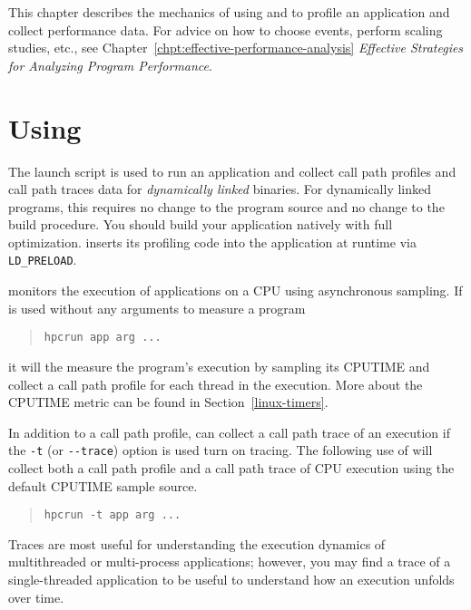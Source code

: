 
This chapter describes the mechanics of using \hpcrun{} and \hpclink{}
to profile an application and collect performance data.  For advice on
how to choose events, perform scaling studies, etc., see
Chapter~\ref{chpt:effective-performance-analysis} {\it Effective
Strategies for Analyzing Program Performance}.

\section{Using \hpcrun{}}

The \hpcrun{} launch script is used to run an application and collect
call path profiles and call path traces  data for {\it dynamically linked\/} binaries. For
dynamically linked programs, this requires no change to the program
source and no change to the build procedure.  You should build your
application natively with full optimization.  \hpcrun{} inserts its
profiling code into the application at runtime via \verb|LD_PRELOAD|.

\hpcrun{} monitors the execution of applications on a CPU using asynchronous sampling.  If \hpcrun{} is used without any arguments to measure a program  
 
 \begin{quote}
\begin{verbatim}
hpcrun app arg ...
\end{verbatim}
\end{quote}

\noindent
it will the measure the program's execution by sampling its CPUTIME and collect a call path profile for each thread in the execution. More about the CPUTIME metric can be found in Section~\ref{linux-timers}.

In addition to a call path profile,  \hpcrun{} can collect a call path trace of an execution if the \verb|-t| (or \verb|--trace|) option is used
turn on tracing. The following use of \hpcrun{} will collect both a call path profile and a call path trace of CPU execution using the default CPUTIME sample source.

 \begin{quote}
\begin{verbatim}
hpcrun -t app arg ...
\end{verbatim}
\end{quote}

\noindent
Traces are most useful for understanding the execution dynamics of multithreaded or multi-process applications; however, you may find a trace of a single-threaded application to be useful to understand how an execution unfolds over time.

